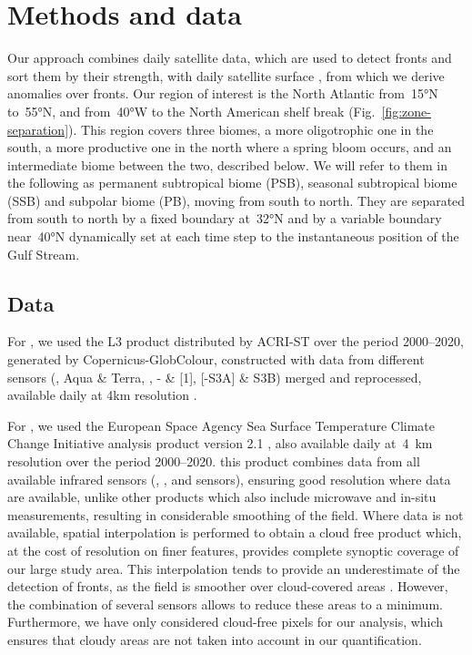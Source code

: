 \section{Methods and data}

Our approach combines daily satellite  data, which are used to detect fronts and sort them by their strength, with daily satellite surface , from which we derive anomalies over fronts.
Our region of interest is the North Atlantic from~\ang{15}N to~\ang{55}N, and from~\ang{40}W to the North American shelf break (Fig.~\ref{fig:zone-separation}).
This region covers three biomes, a more oligotrophic one in the south, a more productive one in the north where a spring bloom occurs, and an intermediate biome between the two, described below.
We will refer to them in the following as permanent subtropical biome (PSB), seasonal subtropical biome (SSB) and subpolar biome (PB), moving from south to north.
They are separated from south to north by a fixed boundary at~\ang{32}N and by a variable boundary near~\ang{40}N dynamically set at each time step to the instantaneous position of the Gulf Stream.

\subsection{Data}

For , we used the L3 product distributed by ACRI-ST over the period 2000--2020, generated by Copernicus-GlobColour, constructed with data from different sensors (,  Aqua \& Terra, , - \& [1], [-S3A] \& S3B) merged and reprocessed, available daily at 4km resolution \parencite{chl}.

For , we used the European Space Agency Sea Surface Temperature Climate Change Initiative analysis product version 2.1 \parencite{merchant_2019, good_2020, sst}, also available daily at~\qty{4}{\km} resolution over the period 2000--2020.
this product combines data from all available infrared sensors (, , and  sensors), ensuring good resolution where data are available, unlike other  products which also include microwave and in-situ measurements, resulting in considerable smoothing of the  field. %
Where  data is not available, spatial interpolation is performed to obtain a cloud free product which, at the cost of resolution on finer features, provides complete synoptic coverage of our large study area.
This interpolation tends to provide an underestimate of the detection of fronts, as the  field is smoother over cloud-covered areas \parencite{merchant_2019}.
However, the combination of several sensors allows to reduce these areas to a minimum.
Furthermore, we have only considered cloud-free pixels for our analysis, which ensures that cloudy areas are not taken into account in our quantification.


